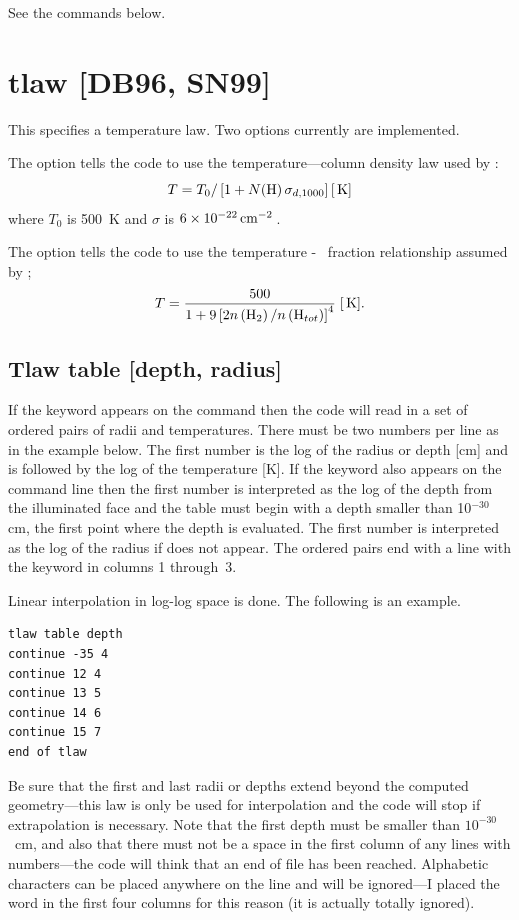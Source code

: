 See the  commands below.

\section{tlaw [DB96, SN99]}

This specifies a temperature law.
Two options currently are implemented.

The  option tells the code to use
the temperature---column density
law used by \citet{Draine1996}:
\begin{equation}
T = T_0 /\left[ {1 + N({\mathrm{H}})\,\sigma _{d{,}1000} } \right]
 [{\rm\thinspace K} ]
\end{equation}
where $T_0$ is 500~K and $\sigma$ is $6\times 10^{-22} \mbox{${\rm\thinspace cm}^{-2}\,$}$.

The  option tells the code to use
the temperature - \htwo\ fraction
relationship assumed by \citet{Sternberg1999};
\begin{equation}
T = \frac{{500}}{{1 + 9\left[ {2n\left( {{\mathrm{H}}_2 } \right)/n\left(
{{\mathrm{H}}_{tot} } \right)} \right]^4 }}
 \; [{\rm\thinspace K}].
\end{equation}

\subsection{Tlaw table [depth, radius]}

If the keyword  appears on the 
command then the code will read
in a set of ordered pairs of radii and temperatures.
There must be two numbers per line
as in the example below.
The first number is the log of the radius or depth
[cm] and is followed by the log of the temperature [K].
If the
keyword  also appears on the command line then
the first number is
interpreted as the log of the depth from the illuminated face
and the table
must begin with a depth smaller than 10$^{-30}$ cm,
the first point where the
depth is evaluated.
The first number is interpreted as the log of the radius
if  does not appear.
The ordered pairs end with a line with the keyword
 in columns 1 through~3.

Linear interpolation in log-log space is done.
The following is an example.
\begin{verbatim}
tlaw table depth
continue -35 4
continue 12 4
continue 13 5
continue 14 6
continue 15 7
end of tlaw
\end{verbatim}

Be sure that the first and last radii or depths extend beyond the computed
geometry---this law is only be used for interpolation and the code will
stop if extrapolation is necessary.
Note that the first depth must be
smaller than $10^{-30}$~cm,
and also that there must not be a space in the first
column of any lines with numbers---the code will think that an end of file
has been reached.
Alphabetic characters can be placed anywhere on the line
and will be ignored---I placed the word
 in the first four columns
for this reason (it is actually totally ignored).

